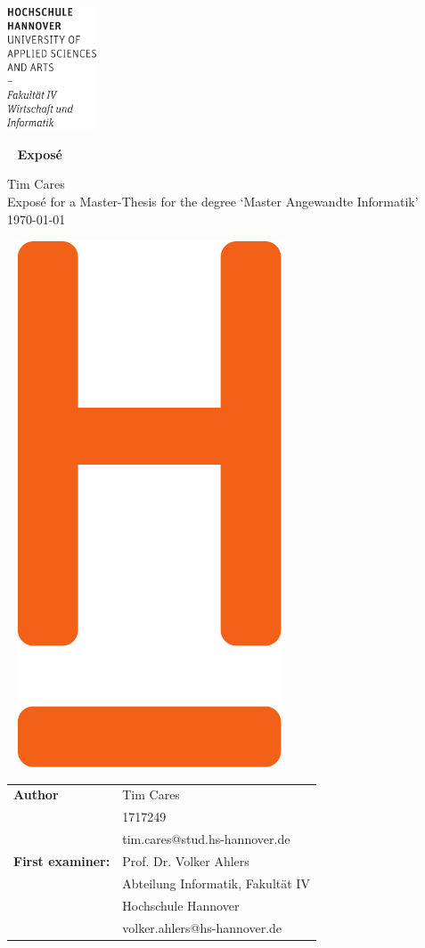 \documentclass[fontsize=12pt,paper=a4,twoside=semi,parskip=half-,headsepline,headinclude]{scrreprt}
\begin{document}
  \thispagestyle{empty} %
\includegraphics[width=0.2\textwidth]{Wortmarke_WI_schwarz}

   {  ~ \sffamily
  \vfill
  {\Huge\bfseries Exposé}
  \bigskip

  {\Large 
  Tim Cares \\[2ex]
  Exposé for a Master-Thesis for the degree `Master Angewandte Informatik' 
 \\[5ex]
   \today } 
}
 \vfill
  
  ~ \hfill
  \includegraphics[height=0.3\paperheight]{H_WI_Pantone1665} 

\vspace*{-3cm}

  \newpage \thispagestyle{empty}
 \begin{tabular}{ll}
{\bfseries\sffamily Author} &  Tim Cares \\ 
            & 1717249 \\
            & tim.cares@stud.hs-hannover.de \\[5ex]
{\bfseries\sffamily First examiner:} & Prof. Dr. Volker Ahlers \\
          & Abteilung Informatik, Fakultät IV \\
         & Hochschule Hannover \\
        & volker.ahlers@hs-hannover.de \\[5ex]
\end{tabular}
\end{document}
